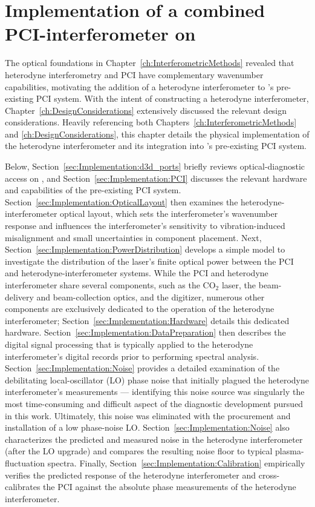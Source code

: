 \chapter{Implementation of a combined PCI-interferometer on \diiid}
\label{ch:Implementation}
The optical foundations in
Chapter~\ref{ch:InterferometricMethods}
revealed that heterodyne interferometry and PCI
have complementary wavenumber capabilities,
motivating the addition of a heterodyne interferometer
to \diiid's pre-existing PCI system.
With the intent of constructing a heterodyne interferometer,
Chapter~\ref{ch:DesignConsiderations} extensively discussed
the relevant design considerations.
Heavily referencing both Chapters~\ref{ch:InterferometricMethods} and
\ref{ch:DesignConsiderations},
this chapter details the physical implementation
of the heterodyne interferometer and
its integration into \diiid's pre-existing PCI system.

Below, Section~\ref{sec:Implementation:d3d_ports} briefly reviews
optical-diagnostic access on \diiid, and
Section~\ref{sec:Implementation:PCI} discusses
the relevant hardware and capabilities
of the pre-existing PCI system.
Section~\ref{sec:Implementation:OpticalLayout} then examines
the heterodyne-interferometer optical layout, which
sets the interferometer's wavenumber response and
influences the interferometer's sensitivity
to vibration-induced misalignment and
small uncertainties in component placement.
Next, Section~\ref{sec:Implementation:PowerDistribution} develops
a simple model to investigate the distribution
of the laser's finite optical power
between the PCI and heterodyne-interferometer systems.
While the PCI and heterodyne interferometer share several components,
such as the CO$_2$ laser,
the beam-delivery and beam-collection optics, and
the digitizer,
numerous other components
are exclusively dedicated to the operation
of the heterodyne interferometer;
Section~\ref{sec:Implementation:Hardware} details
this dedicated hardware.
Section~\ref{sec:Implementation:DataPreparation} then describes
the digital signal processing that is typically applied
to the heterodyne interferometer's digital records
prior to performing spectral analysis.
Section~\ref{sec:Implementation:Noise} provides
a detailed examination of
the debilitating local-oscillator (LO) phase noise
that initially plagued the heterodyne interferometer's measurements ---
identifying this noise source was singularly
the most time-consuming and difficult aspect
of the diagnostic development pursued in this work.
Ultimately, this noise was eliminated
with the procurement and installation of a low phase-noise LO.
Section~\ref{sec:Implementation:Noise} also characterizes
the predicted and measured noise
in the heterodyne interferometer (after the LO upgrade) and
compares the resulting noise floor
to typical plasma-fluctuation spectra.
Finally, Section~\ref{sec:Implementation:Calibration} empirically verifies
the predicted response of the heterodyne interferometer and
cross-calibrates the PCI against the absolute phase measurements
of the heterodyne interferometer.

